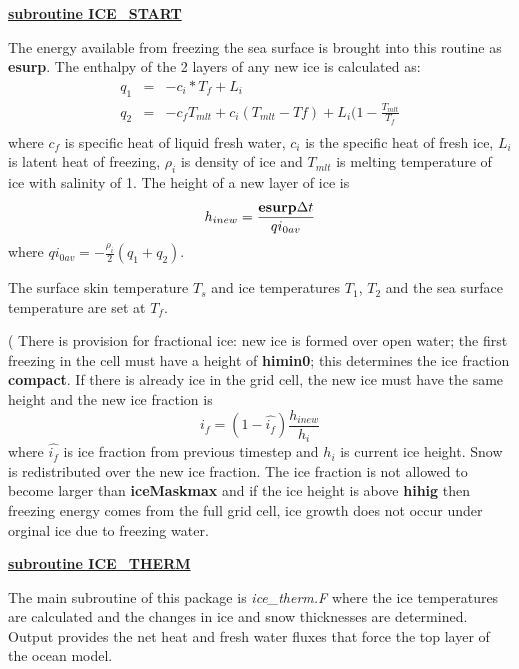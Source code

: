 
\vspace{1cm}
\noindent
{\bf {\underline{ subroutine ICE\_START}}}

\noindent
The energy available from freezing
the sea surface is brought into this routine as {\bf esurp}.
The enthalpy of the 2 layers of any new ice is calculated as:
\begin{eqnarray}
q_1 & = & -c_{i}*T_f + L_i \nonumber \\
q_2 & = & -c_{f}T_{mlt}+ c_{i}(T_{mlt}-T{f}) + L_i(1-\frac{T_{mlt}}{T_f} 
\nonumber \\
\end{eqnarray}
where  $c_f$ is specific heat of liquid fresh water, $c_i$ is the
specific heat of fresh ice, $L_i$ is latent heat of freezing, 
$\rho_i$ is density of ice and
$T_{mlt}$ is melting temperature of ice with salinity of 1.
The height of a new layer of ice is
\[
  h_{i new} = \frac{{\bf esurp} \Delta t}{qi_{0av}}
\]
where $qi_{0av}=-\frac{\rho_i}{2} (q_1+q_2)$.

The surface skin temperature $T_s$ and ice temperatures
$T_1$, $T_2$ and the sea surface temperature are set at $T_f$.

\noindent
{\tiny ( There is provision for fractional ice:
new ice is formed over open water; the first freezing in the cell
must have a height of {\bf himin0}; this determines the ice
fraction {\bf compact}. If there is already ice in the grid cell,
the new ice must have the same height and the new ice fraction
is 
\[
i_f=(1-\hat{i_f}) \frac{h_{i new}}{h_i}
\]
where $\hat{i_f}$ is ice fraction from previous timestep
and $h_i$ is current ice height. Snow is redistributed 
over the new ice fraction. The ice fraction is
not allowed to become larger than {\bf iceMaskmax} and
if the ice height is above {\bf hihig} then freezing energy
comes from the full grid cell,  ice growth does not occur
under orginal ice due to freezing water.
}

\vspace{1cm}
\noindent
{\bf {\underline{subroutine ICE\_THERM}}}

\noindent
The main subroutine of this package is {\it ice\_therm.F} where the
ice temperatures are calculated and the changes in ice and snow
thicknesses are determined. Output provides the net heat and fresh 
water fluxes that force the top layer of the ocean model.

